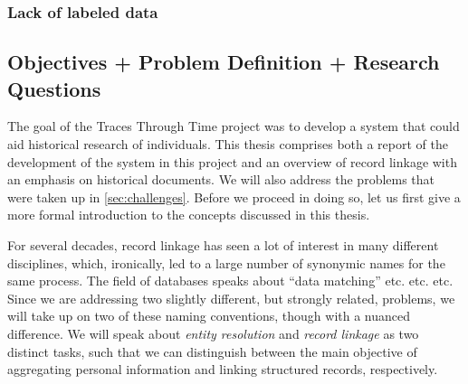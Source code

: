 \subsubsection{Lack of labeled data}




\subsection{Objectives + Problem Definition + Research Questions}
The goal of the Traces Through Time project was to develop a system that could aid historical research of individuals.
This thesis comprises both a report of the development of the system in this project and an overview of record linkage with an emphasis on historical documents.
We will also address the problems that were taken up in \cref{sec:challenges}.
Before we proceed in doing so, let us first give a more formal introduction to the concepts discussed in this thesis.

For several decades, record linkage has seen a lot of interest in many different disciplines, which, ironically, led to a large number of synonymic names for the same process.
The field of databases speaks about ``data matching''  etc. etc. etc.
Since we are addressing two slightly different, but strongly related, problems, we will take up on two of these naming conventions, though with a nuanced difference.
We will speak about \emph{entity resolution} and \emph{record linkage} as two distinct tasks, such that we can distinguish between the main objective of aggregating personal information and linking structured records, respectively.

